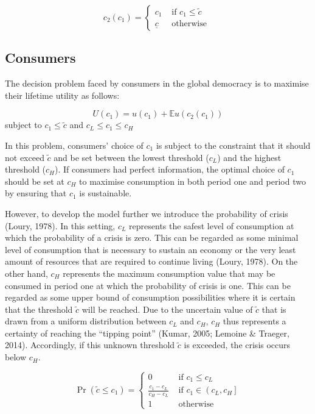 \documentclass[11pt,preprint, authoryear]{elsarticle}
\numberwithin{equation}{section}
\numberwithin{figure}{section}
\numberwithin{table}{section}
\begin{document}
\[
c_2\left(c_1\right)= \begin{cases}c_1 & \text { if } c_1 \leq \tilde{c} \\ \underline{c} & \text { otherwise }\end{cases}
\]

\hypertarget{consumers}{%
\subsection*{Consumers}\label{consumers}}

The decision problem faced by consumers in the global democracy is to
maximise their lifetime utility as follows:

\[
U\left(c_1\right)=u\left(c_1\right)+\mathbb{E} u\left(c_2\left(c_1\right)\right)
\] subject to \(c_1 \leq \tilde{c}\) and \(c_L \leq c_1 \leq c_H\)

In this problem, consumers' choice of \(c_1\) is subject to the
constraint that it should not exceed \(\tilde{c}\) and be set between
the lowest threshold (\(c_L\)) and the highest threshold (\(c_H\)). If
consumers had perfect information, the optimal choice of \(c_1\) should
be set at \(c_H\) to maximise consumption in both period one and period
two by ensuring that \(c_1\) is sustainable.

However, to develop the model further we introduce the probability of
crisis (Loury, 1978). In this setting, \(c_L\) represents the safest
level of consumption at which the probability of a crisis is zero. This
can be regarded as some minimal level of consumption that is necessary
to sustain an economy or the very least amount of resources that are
required to continue living (Loury, 1978). On the other hand, \(c_H\)
represents the maximum consumption value that may be consumed in period
one at which the probability of crisis is one. This can be regarded as
some upper bound of consumption possibilities where it is certain that
the threshold \(\tilde{c}\) will be reached. Due to the uncertain value
of \(\tilde{c}\) that is drawn from a uniform distribution between
\(c_L\) and \(c_H\), \(c_H\) thus represents a certainty of reaching the
``tipping point'' (Kumar, 2005; Lemoine \& Traeger, 2014). Accordingly,
if this unknown threshold \(\tilde{c}\) is exceeded, the crisis occurs
below \(c_H\).

\[
\operatorname{Pr}\left(\tilde{c} \leq c_1\right)=\left\{\begin{array}{cc}
0 & \text { if } c_1 \leq c_L \\
\frac{c_1-c_L}{c_H-c_L} & \text { if } c_1 \in\left(c_L, c_H\right] \\
1 & \text { otherwise }
\end{array}\right.
\]
\end{document}
